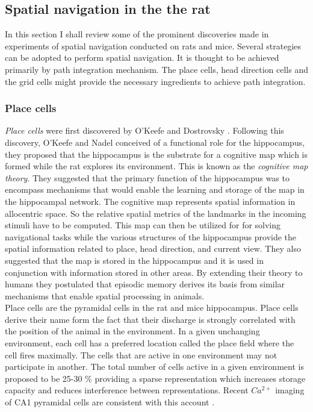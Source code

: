 \subsection{Spatial navigation in the the rat}
In this section I shall review some of the prominent discoveries made in experiments of spatial navigation conducted on rats and mice. Several strategies can be adopted to perform spatial navigation. It is thought to be achieved primarily by path integration mechanism. The place cells, head direction cells and the grid cells might provide the necessary ingredients to achieve path integration. 

\subsubsection{Place cells}
\label{placeCells}
 \emph{Place cells} were first discovered by O'Keefe and Dostrovsky \cite{O'Keefe1971a}. Following this discovery, O'Keefe and Nadel \cite{Street}  conceived of a functional role for the hippocampus, they proposed that the hippocampus is the substrate for a cognitive map which is formed while the rat explores its environment. This is known as the \emph{cognitive map theory}. They suggested that the primary function of the hippocampus was to encompass mechanisms that would enable the learning and storage of the map in the hippocampal network. The cognitive map represents spatial information in allocentric space. So the relative spatial metrics of the landmarks in the incoming stimuli have to be computed. This map can then be utilized for for solving navigational tasks while the various structures of the hippocampus provide the spatial information related to place, head direction, and current view. They also suggested that the map is stored in the hippocampus and it is used in conjunction with information stored in other areas. By extending their theory to humans they postulated that episodic memory derives its basis from similar mechanisms that enable spatial processing in animals.\\ 
Place cells are the  pyramidal cells in the rat and mice hippocampus. Place cells derive their name form the fact that their discharge is strongly correlated with the position of the animal in the environment. In a given unchanging environment, each cell has a preferred location called the place field where the cell fires maximally.  The cells that are active in one environment may not participate in another. The total number of cells active in a given environment is proposed to be 25-30 \% providing a sparse representation which increases storage capacity and reduces interference between representations\cite{Marr2007, Wilson1993a}. Recent $Ca^{2+}$ imaging of CA1 pyramidal cells are consistent with this account \cite{Ziv2013}.
